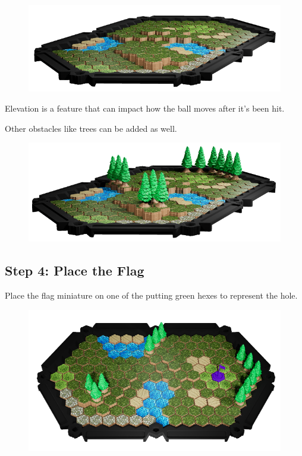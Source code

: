 \documentclass[../main.tex]{subfiles}
\begin{document}
\begin{figure}[h]
    \centering
    \includegraphics[width=1\linewidth]{chapters//boardsetup/Source Golf with Elevation.png}
\end{figure}
Elevation is a feature that can impact how the ball moves after it's been hit.

Other obstacles like trees can be added as well. 
\begin{figure}[h]
    \centering
    \includegraphics[width=1\linewidth]{chapters//boardsetup/Source Golf Base with Elevation.Trees.png}
\end{figure}

\subsection{Step 4: Place the Flag}
Place the flag miniature on one of the putting green hexes to represent the hole. 
\begin{figure}[h]
    \centering
    \includegraphics[width=1\linewidth]{chapters//boardsetup/Source Golf full hole topdown.png}
\end{figure}
\end{document}
